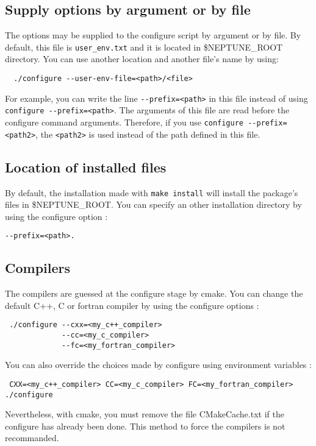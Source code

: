\documentclass[12pt,a4paper]{article}
\begin{document}
\subsection {Supply options by argument or by file}
The options may be supplied to the configure script by argument or by
file. By default, this file is \verb|user_env.txt| and it is located in
\$NEPTUNE\_ROOT directory.  You can use another location and another 
file's name by using:
\begin{verbatim}
  ./configure --user-env-file=<path>/<file>
\end{verbatim}
For example, you can write the line \verb|--prefix=<path>| in this file
instead of using \verb|configure --prefix=<path>|.
The arguments of this file are read before the configure command
arguments. Therefore, if you use \verb|configure --prefix=<path2>|, the
\verb|<path2>| is used instead of the path defined in this file.


\subsection {Location of installed files}
By default, the installation made with \verb|make install| will install
the package's files in \$NEPTUNE\_ROOT.  You can specify an other 
installation directory by using the configure option :
\begin{verbatim}
--prefix=<path>.
\end{verbatim}



\subsection {Compilers}
The compilers are guessed at the configure stage by cmake.
You can change the default C++, C or fortran compiler by
using the configure options :
\begin{verbatim}
 ./configure --cxx=<my_c++_compiler>
             --cc=<my_c_compiler> 
             --fc=<my_fortran_compiler>
\end{verbatim}

You can also override the choices made by configure using environment variables :
\begin{verbatim}
 CXX=<my_c++_compiler> CC=<my_c_compiler> FC=<my_fortran_compiler> ./configure
\end{verbatim}
Nevertheless, with cmake, you must remove the file CMakeCache.txt if
the configure has already been done. This method to force the
compilers is not recommanded.
\end{document}
